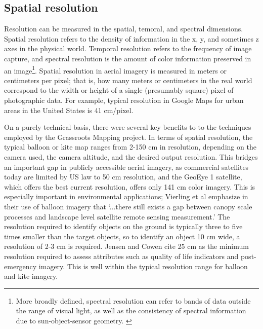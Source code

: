 \documentclass[11pt,oneside,notitlepage]{report}
\begin{document}
\subsection{Spatial resolution}

Resolution can be measured in the spatial, temoral, and spectral dimensions. Spatial resolution refers to the density of information in the x, y, and sometimes z axes in the physical world. Temporal resolution refers to the frequency of image capture, and spectral resolution is the amount of color information preserved in an image\footnote{More broadly defined, spectral resolution can refer to bands of data outside the range of visual light, as well as the consistency of spectral information due to sun-object-sensor geometry. \cite{tuominen2005landsat}}. Spatial resolution in aerial imagery is measured in meters or centimeters per pixel; that is, how many meters or centimeters in the real world correspond to the width or height of a single (presumably square) pixel of photographic data. For example, typical resolution in Google Maps for urban areas in the United States is 41 cm/pixel. 
 
On a purely technical basis, there were several key benefits to to the techniques employed by the Grassroots Mapping project. In terms of spatial resolution, the typical balloon or kite map ranges from 2-150 cm in resolution, depending on the camera used, the camera altitude, and the desired output resolution. This bridges an important gap in publicly accessible aerial imagery, as commercial satellites today are limited by US law to 50 cm resolution, and the GeoEye 1 satellite, which offers the best current resolution, offers only 141 cm color imagery. This is especially important in environmental applications; Vierling et al emphasize in their use of balloon imagery that `...there still exists a gap between canopy scale processes and landscape level satellite remote sensing measurement.' \cite{vierling2006short} The resolution required to identify objects on the ground is typically three to five times smaller than the target objects, so to identify an object 10 cm wide, a resolution of 2-3 cm is required. \cite{aber2002unmanned} Jensen and Cowen cite 25 cm as the minimum resolution required to assess attributes such as quality of life indicators and post-emergency imagery. This is well within the typical resolution range for balloon and kite imagery. \cite{jensen1999remote} 
\end{document}
